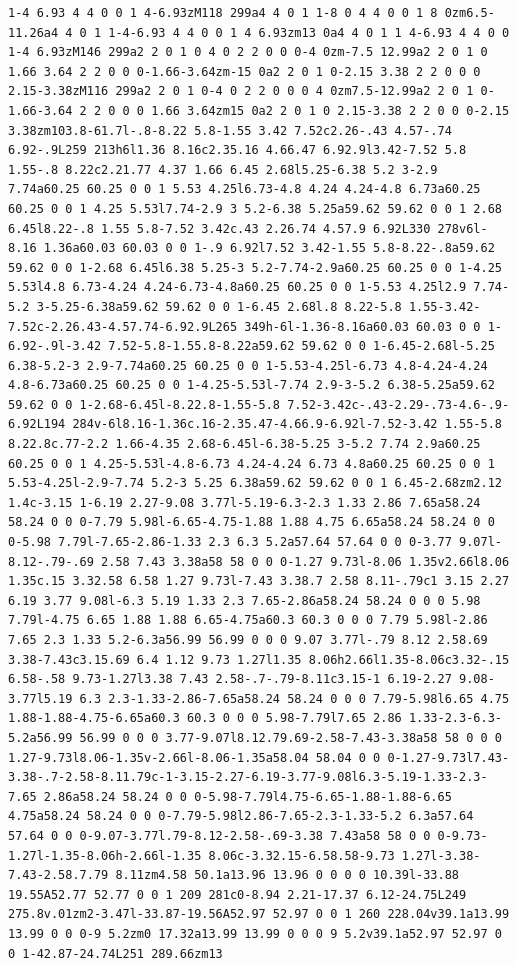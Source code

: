 \documentclass[11pt]{article}
\begin{document}
\begin{enumerate}
\begin{verbatim}
1-4 6.93 4 4 0 0 1 4-6.93zM118 299a4 4 0 1 1-8 0 4 4 0 0 1 8 0zm6.5-11.26a4 4 0 1 1-4-6.93 4 4 0 0 1 4 6.93zm13 0a4 4 0 1 1 4-6.93 4 4 0 0 1-4 6.93zM146 299a2 2 0 1 0 4 0 2 2 0 0 0-4 0zm-7.5 12.99a2 2 0 1 0 1.66 3.64 2 2 0 0 0-1.66-3.64zm-15 0a2 2 0 1 0-2.15 3.38 2 2 0 0 0 2.15-3.38zM116 299a2 2 0 1 0-4 0 2 2 0 0 0 4 0zm7.5-12.99a2 2 0 1 0-1.66-3.64 2 2 0 0 0 1.66 3.64zm15 0a2 2 0 1 0 2.15-3.38 2 2 0 0 0-2.15 3.38zm103.8-61.7l-.8-8.22 5.8-1.55 3.42 7.52c2.26-.43 4.57-.74 6.92-.9L259 213h6l1.36 8.16c2.35.16 4.66.47 6.92.9l3.42-7.52 5.8 1.55-.8 8.22c2.21.77 4.37 1.66 6.45 2.68l5.25-6.38 5.2 3-2.9 7.74a60.25 60.25 0 0 1 5.53 4.25l6.73-4.8 4.24 4.24-4.8 6.73a60.25 60.25 0 0 1 4.25 5.53l7.74-2.9 3 5.2-6.38 5.25a59.62 59.62 0 0 1 2.68 6.45l8.22-.8 1.55 5.8-7.52 3.42c.43 2.26.74 4.57.9 6.92L330 278v6l-8.16 1.36a60.03 60.03 0 0 1-.9 6.92l7.52 3.42-1.55 5.8-8.22-.8a59.62 59.62 0 0 1-2.68 6.45l6.38 5.25-3 5.2-7.74-2.9a60.25 60.25 0 0 1-4.25 5.53l4.8 6.73-4.24 4.24-6.73-4.8a60.25 60.25 0 0 1-5.53 4.25l2.9 7.74-5.2 3-5.25-6.38a59.62 59.62 0 0 1-6.45 2.68l.8 8.22-5.8 1.55-3.42-7.52c-2.26.43-4.57.74-6.92.9L265 349h-6l-1.36-8.16a60.03 60.03 0 0 1-6.92-.9l-3.42 7.52-5.8-1.55.8-8.22a59.62 59.62 0 0 1-6.45-2.68l-5.25 6.38-5.2-3 2.9-7.74a60.25 60.25 0 0 1-5.53-4.25l-6.73 4.8-4.24-4.24 4.8-6.73a60.25 60.25 0 0 1-4.25-5.53l-7.74 2.9-3-5.2 6.38-5.25a59.62 59.62 0 0 1-2.68-6.45l-8.22.8-1.55-5.8 7.52-3.42c-.43-2.29-.73-4.6-.9-6.92L194 284v-6l8.16-1.36c.16-2.35.47-4.66.9-6.92l-7.52-3.42 1.55-5.8 8.22.8c.77-2.2 1.66-4.35 2.68-6.45l-6.38-5.25 3-5.2 7.74 2.9a60.25 60.25 0 0 1 4.25-5.53l-4.8-6.73 4.24-4.24 6.73 4.8a60.25 60.25 0 0 1 5.53-4.25l-2.9-7.74 5.2-3 5.25 6.38a59.62 59.62 0 0 1 6.45-2.68zm2.12 1.4c-3.15 1-6.19 2.27-9.08 3.77l-5.19-6.3-2.3 1.33 2.86 7.65a58.24 58.24 0 0 0-7.79 5.98l-6.65-4.75-1.88 1.88 4.75 6.65a58.24 58.24 0 0 0-5.98 7.79l-7.65-2.86-1.33 2.3 6.3 5.2a57.64 57.64 0 0 0-3.77 9.07l-8.12-.79-.69 2.58 7.43 3.38a58 58 0 0 0-1.27 9.73l-8.06 1.35v2.66l8.06 1.35c.15 3.32.58 6.58 1.27 9.73l-7.43 3.38.7 2.58 8.11-.79c1 3.15 2.27 6.19 3.77 9.08l-6.3 5.19 1.33 2.3 7.65-2.86a58.24 58.24 0 0 0 5.98 7.79l-4.75 6.65 1.88 1.88 6.65-4.75a60.3 60.3 0 0 0 7.79 5.98l-2.86 7.65 2.3 1.33 5.2-6.3a56.99 56.99 0 0 0 9.07 3.77l-.79 8.12 2.58.69 3.38-7.43c3.15.69 6.4 1.12 9.73 1.27l1.35 8.06h2.66l1.35-8.06c3.32-.15 6.58-.58 9.73-1.27l3.38 7.43 2.58-.7-.79-8.11c3.15-1 6.19-2.27 9.08-3.77l5.19 6.3 2.3-1.33-2.86-7.65a58.24 58.24 0 0 0 7.79-5.98l6.65 4.75 1.88-1.88-4.75-6.65a60.3 60.3 0 0 0 5.98-7.79l7.65 2.86 1.33-2.3-6.3-5.2a56.99 56.99 0 0 0 3.77-9.07l8.12.79.69-2.58-7.43-3.38a58 58 0 0 0 1.27-9.73l8.06-1.35v-2.66l-8.06-1.35a58.04 58.04 0 0 0-1.27-9.73l7.43-3.38-.7-2.58-8.11.79c-1-3.15-2.27-6.19-3.77-9.08l6.3-5.19-1.33-2.3-7.65 2.86a58.24 58.24 0 0 0-5.98-7.79l4.75-6.65-1.88-1.88-6.65 4.75a58.24 58.24 0 0 0-7.79-5.98l2.86-7.65-2.3-1.33-5.2 6.3a57.64 57.64 0 0 0-9.07-3.77l.79-8.12-2.58-.69-3.38 7.43a58 58 0 0 0-9.73-1.27l-1.35-8.06h-2.66l-1.35 8.06c-3.32.15-6.58.58-9.73 1.27l-3.38-7.43-2.58.7.79 8.11zm4.58 50.1a13.96 13.96 0 0 0 0 10.39l-33.88 19.55A52.77 52.77 0 0 1 209 281c0-8.94 2.21-17.37 6.12-24.75L249 275.8v.01zm2-3.47l-33.87-19.56A52.97 52.97 0 0 1 260 228.04v39.1a13.99 13.99 0 0 0-9 5.2zm0 17.32a13.99 13.99 0 0 0 9 5.2v39.1a52.97 52.97 0 0 1-42.87-24.74L251 289.66zm13 
\end{verbatim}
\end{enumerate}
\end{document}
